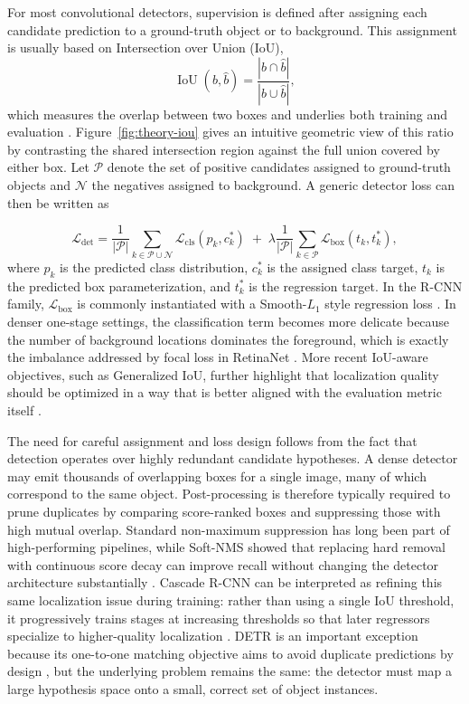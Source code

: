 For most convolutional detectors, supervision is defined after assigning each candidate prediction to a ground-truth object or to background. This assignment is usually based on Intersection over Union (IoU),
\[
  \operatorname{IoU}(b,\hat{b}) = \frac{|b \cap \hat{b}|}{|b \cup \hat{b}|},
\]
which measures the overlap between two boxes and underlies both training and evaluation \cite{everingham2010voc,lin2014coco,rezatofighi2019giou}. Figure~\ref{fig:theory-iou} gives an intuitive geometric view of this ratio by contrasting the shared intersection region against the full union covered by either box. Let $\mathcal{P}$ denote the set of positive candidates assigned to ground-truth objects and $\mathcal{N}$ the negatives assigned to background. A generic detector loss can then be written as

\IoUFigure

\[
  \mathcal{L}_{\text{det}}
  =
  \frac{1}{|\mathcal{P}|}
  \sum_{k \in \mathcal{P}\cup\mathcal{N}}
  \mathcal{L}_{\text{cls}}(p_k, c_k^\ast)
  \;+\;
  \lambda
  \frac{1}{|\mathcal{P}|}
  \sum_{k \in \mathcal{P}}
  \mathcal{L}_{\text{box}}(t_k, t_k^\ast),
\]
where $p_k$ is the predicted class distribution, $c_k^\ast$ is the assigned class target, $t_k$ is the predicted box parameterization, and $t_k^\ast$ is the regression target. In the R-CNN family, $\mathcal{L}_{\text{box}}$ is commonly instantiated with a Smooth-$L_1$ style regression loss \cite{girshick2015fast,ren2015faster}. In denser one-stage settings, the classification term becomes more delicate because the number of background locations dominates the foreground, which is exactly the imbalance addressed by focal loss in RetinaNet \cite{lin2017focal}. More recent IoU-aware objectives, such as Generalized IoU, further highlight that localization quality should be optimized in a way that is better aligned with the evaluation metric itself \cite{rezatofighi2019giou}.

The need for careful assignment and loss design follows from the fact that detection operates over highly redundant candidate hypotheses. A dense detector may emit thousands of overlapping boxes for a single image, many of which correspond to the same object. Post-processing is therefore typically required to prune duplicates by comparing score-ranked boxes and suppressing those with high mutual overlap. Standard non-maximum suppression has long been part of high-performing pipelines, while Soft-NMS showed that replacing hard removal with continuous score decay can improve recall without changing the detector architecture substantially \cite{girshick2014rcnn,ren2015faster,bodla2017softnms}. Cascade R-CNN can be interpreted as refining this same localization issue during training: rather than using a single IoU threshold, it progressively trains stages at increasing thresholds so that later regressors specialize to higher-quality localization \cite{cai2021cascade}. DETR is an important exception because its one-to-one matching objective aims to avoid duplicate predictions by design \cite{carion2020detr}, but the underlying problem remains the same: the detector must map a large hypothesis space onto a small, correct set of object instances.

